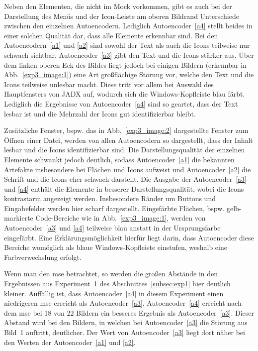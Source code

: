 Neben den Elementen, die nicht im Mock vorkommen, gibt es auch bei der Darstellung des Menüs und der Icon-Leiste am oberen Bildrand Unterschiede zwischen den einzelnen Autoencodern. Lediglich Autoencoder~\ref{a4} stellt beides in einer solchen Qualität dar, dass alle Elemente erkennbar sind. Bei den Autoencodern~\ref{a1} und \ref{a2} sind sowohl der Text als auch die Icons teilweise nur schwach sichtbar. Autoencoder~\ref{a3} gibt den Text und die Icons stärker aus. Über dem linken oberen Eck des Bildes liegt jedoch bei einigen Bildern (erkennbar in Abb.~\ref{exp3_image:1}) eine Art großflächige Störung vor, welche den Text und die Icons teilweise unlesbar macht. Diese tritt vor allem bei Auswahl des Hauptfensters von JADX auf, wodurch sich die Windows-Kopfleiste blau färbt. Lediglich die Ergebnisse von Autoencoder~\ref{a4} sind so geartet, dass der Text lesbar ist und die Mehrzahl der Icons gut identifizierbar bleibt.

Zusätzliche Fenster, bspw. das in Abb.~\ref{exp3_image:2} dargestellte Fenster zum Öffnen einer Datei, werden von allen Autoencodern so dargestellt, dass der Inhalt lesbar und die Icons identifizierbar sind. Die Darstellungsqualität der einzelnen Elemente schwankt jedoch deutlich, sodass Autoencoder~\ref{a1} die bekannten Artefakte insbesondere bei Flächen und Icons aufweist und Autoencoder~\ref{a2} die Schrift und die Icons eher schwach darstellt. Die Ausgabe der Autoencoder~\ref{a3} und \ref{a4} enthält die Elemente in besserer Darstellungsqualität, wobei die Icons kontrastarm angezeigt werden. Insbesondere Ränder um Buttons und Eingabefelder werden hier scharf dargestellt. Eingefärbte Flächen, bspw. gelb-markierte Code-Bereiche wie in Abb.~\ref{exp3_image:1}, werden von Autoencoder~\ref{a3} und \ref{a4} teilweise blau anstatt in der Ursprungsfarbe eingefärbt. Eine Erklärungsmöglichkeit hierfür liegt darin, dass Autoencoder diese Bereiche womöglich als blaue Windows-Kopfleiste einstufen, weshalb eine Farbverwechslung erfolgt.

Wenn man den \gls{mse} betrachtet, so werden die großen Abstände in den Ergebnissen aus Experiment~1 des Abschnittes~\ref{subsec:exp1} hier deutlich kleiner. Auffällig ist, dass Autoencoder~\ref{a4} in diesem Experiment einen niedrigeren \gls{mse} erreicht als Autoencoder~\ref{a3}. Autoencoder~\ref{a4} erreicht nach dem \gls{mse} bei 18 von 22 Bildern ein besseres Ergebnis als Autoencoder~\ref{a3}. Dieser Abstand wird bei den Bildern, in welchen bei Autoencoder~\ref{a3} die Störung aus Bild~1 auftritt, deutlicher. Der Wert von Autoencoder~\ref{a3} liegt dort näher bei den Werten der Autoencoder~\ref{a1} und \ref{a2}.


